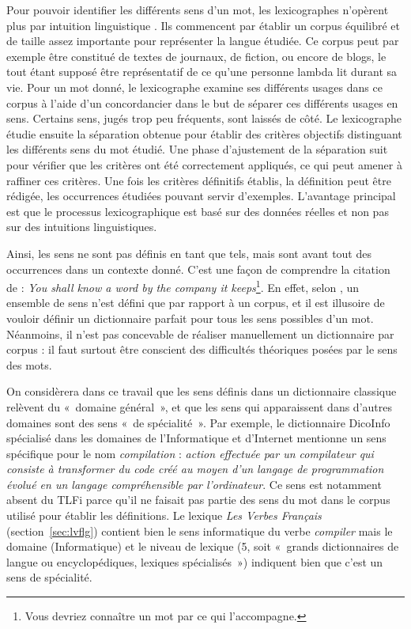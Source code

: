 Pour pouvoir identifier les différents sens d'un mot, les lexicographes
n'opèrent plus par intuition linguistique \citep{kilgarriff1997don}. Ils
commencent par établir un corpus équilibré et de taille assez importante pour
représenter la langue étudiée. Ce corpus peut par exemple être constitué de
textes de journaux, de fiction, ou encore de blogs, le tout étant supposé être
représentatif de ce qu'une personne lambda lit durant sa vie. Pour un mot
donné, le lexicographe examine ses différents usages dans ce corpus à l'aide
d'un concordancier dans le but de séparer ces différents usages en sens.
Certains sens, jugés trop peu fréquents, sont laissés de côté. Le lexicographe
étudie ensuite la séparation obtenue pour établir des critères objectifs
distinguant les différents sens du mot étudié. Une phase d'ajustement de la
séparation suit pour vérifier que les critères ont été correctement appliqués,
ce qui peut amener à raffiner ces critères. Une fois les critères définitifs
établis, la définition peut être rédigée, les occurrences étudiées pouvant
servir d'exemples. L'avantage principal est que le processus lexicographique
est basé sur des données réelles et non pas sur des intuitions linguistiques.

Ainsi, les sens ne sont pas définis en tant que tels, mais sont avant tout des
occurrences dans un contexte donné. C'est une façon de comprendre la citation
de \citep{firth1957synopsys} : \textit{You shall know a word by the company it
keeps}\footnote{Vous devriez connaître un mot par ce qui l'accompagne.}. En
effet, selon \citep{kilgarriff1997don}, un ensemble de sens n'est défini que
par rapport à un corpus, et il est illusoire de vouloir définir un dictionnaire
parfait pour tous les sens possibles d'un mot. Néanmoins, il n'est pas
concevable de réaliser manuellement un dictionnaire par corpus : il faut
surtout être conscient des difficultés théoriques posées par le sens des mots.

On considèrera dans ce travail que les sens définis dans un dictionnaire
classique relèvent du «~domaine général~», et que les sens qui apparaissent
dans d'autres domaines sont des sens «~de spécialité~». Par exemple, le
dictionnaire DicoInfo \citep{corpusolst} spécialisé dans les domaines de
l'Informatique et d'Internet mentionne un sens spécifique pour le nom
\textit{compilation} : \textit{action effectuée par un compilateur qui consiste
    à transformer du code créé au moyen d'un langage de programmation évolué en
un langage compréhensible par l'ordinateur}. Ce sens est notamment absent du
TLFi \citep{TLFi} parce qu'il ne faisait pas partie des sens du mot dans le
corpus utilisé pour établir les définitions. Le lexique \textit{Les Verbes
Français} (section~\ref{sec:lvflg}) contient bien le sens informatique du verbe
\textit{compiler} mais le domaine (Informatique) et le niveau de lexique (5,
soit «~grands dictionnaires de langue ou encyclopédiques, lexiques
spécialisés~») indiquent bien que c'est un sens de spécialité.

